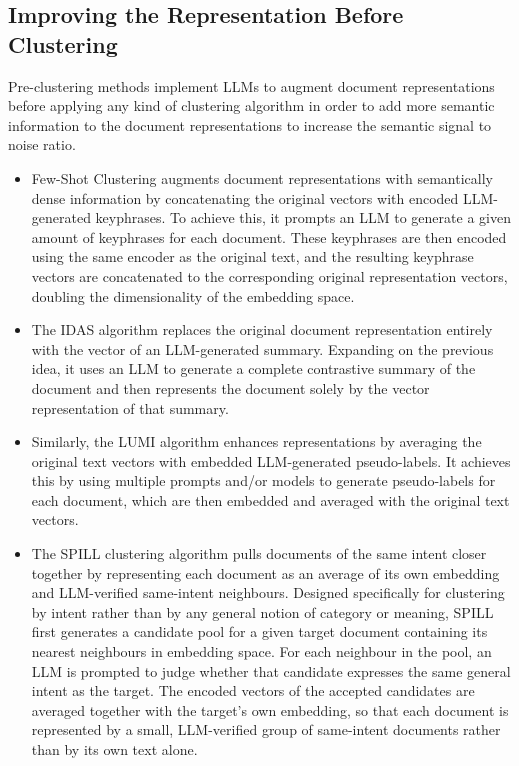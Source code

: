 \documentclass[11pt,a4paper,oneside]{report}
\begin{document}
\subsection{Improving the Representation Before Clustering}\label{sec:before}

Pre-clustering methods implement LLMs to augment document representations before applying any kind of clustering algorithm in order to add more semantic information to the document representations to increase the semantic signal to noise ratio.
\begin{itemize}
\item Few-Shot Clustering \citep{viswanathan2024fewshot} augments document representations with semantically dense information by concatenating the original vectors with encoded LLM-generated keyphrases. To achieve this, it prompts an LLM to generate a given amount of keyphrases for each document. These keyphrases are then encoded using the same encoder as the original text, and the resulting keyphrase vectors are concatenated to the corresponding original representation vectors, doubling the dimensionality of the embedding space.
\item The IDAS algorithm \citep{deraedt2023idas} replaces the original document representation entirely with the vector of an LLM-generated summary. Expanding on the previous idea, it uses an LLM to generate a complete contrastive summary of the document and then represents the document solely by the vector representation of that summary.
\item Similarly, the LUMI algorithm \citep{lin2025lumi} enhances representations by averaging the original text vectors with embedded LLM-generated pseudo-labels. It achieves this by using multiple prompts and/or models to generate pseudo-labels for each document, which are then embedded and averaged with the original text vectors.
\item The SPILL clustering algorithm \citep{lin2025spill} pulls documents of the same intent closer together by representing each document as an average of its own embedding and LLM-verified same-intent neighbours. Designed specifically for clustering by intent rather than by any general notion of category or meaning, SPILL first generates a candidate pool for a given target document containing its nearest neighbours in embedding space. For each neighbour in the pool, an LLM is prompted to judge whether that candidate expresses the same general intent as the target. The encoded vectors of the accepted candidates are averaged together with the target's own embedding, so that each document is represented by a small, LLM-verified group of same-intent documents rather than by its own text alone.

\end{itemize}
\end{document}
